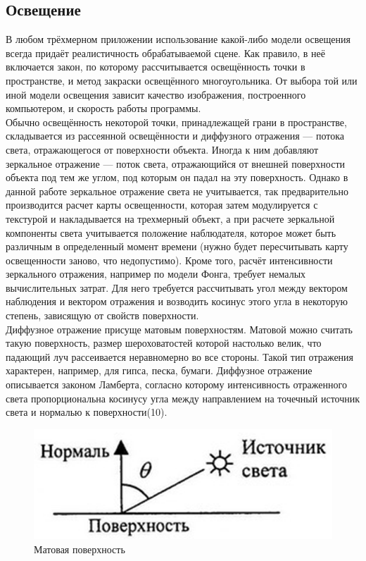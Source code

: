 \documentclass[a4paper, 10pt]{article}
\begin{document}
	\subsection{Освещение}
	\hspace*{5mm} В любом трёхмерном приложении использование какой-либо модели освещения всегда придаёт реалистичность обрабатываемой сцене. Как правило, в неё включается закон, по которому рассчитывается освещённость точки в пространстве, и метод закраски освещённого многоугольника. От выбора той или иной модели освещения зависит качество изображения, построенного компьютером, и скорость работы программы.
	\\ \hspace*{5mm} Обычно освещённость некоторой точки, принадлежащей грани в пространстве, складывается из рассеянной освещённости и диффузного отражения — потока света, отражающегося от поверхности объекта. Иногда к ним добавляют зеркальное отражение — поток света, отражающийся от внешней поверхности объекта под тем же углом, под которым он падал на эту поверхность. Однако в данной работе зеркальное отражение света не учитывается, так предварительно производится расчет карты освещенности, которая затем модулируется с текстурой и накладывается на трехмерный объект, а при расчете зеркальной компоненты света учитывается положение наблюдателя, которое может быть различным в определенный момент времени (нужно будет пересчитывать карту освещенности заново, что недопустимо). Кроме того, расчёт интенсивности зеркального отражения, например по модели Фонга, требует немалых вычислительных затрат. Для него требуется рассчитывать угол между вектором наблюдения и вектором отражения и возводить косинус этого угла в некоторую степень, зависящую от свойств поверхности.
	\\ \hspace*{5mm} Диффузное отражение присуще матовым поверхностям. Матовой можно считать такую поверхность, размер шероховатостей которой настолько велик, что падающий луч рассеивается неравномерно во все стороны. Такой тип отражения характерен, например, для гипса, песка, бумаги. Диффузное отражение описывается законом Ламберта, согласно которому интенсивность отраженного света пропорциональна косинусу угла между направлением на точечный источник света и нормалью к поверхности(10).
	\begin{figure}[h!]
		\centering
		\includegraphics[scale=0.6]{norm}
		\centering\caption{Матовая поверхность}
	\end{figure}
\end{document}
